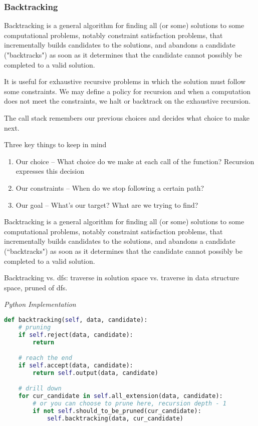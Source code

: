 \documentclass{article}
\begin{document}
    \subsubsection{Backtracking}
    Backtracking is a general algorithm for finding all (or some) solutions to some computational problems, notably constraint satisfaction problems, that incrementally builds candidates to the solutions, and abandons a candidate ("backtracks") as soon as it determines that the candidate cannot possibly be completed to a valid solution. 
    
    It is useful for exhaustive recursive problems in which the solution must follow some constraints. We may define a policy for recursion and when a computation does not meet the constraints, we halt or backtrack on the exhaustive recursion.
    
    The call stack remembers our previous choices and decides what choice to make next.
    
    Three key things to keep in mind
    \begin{enumerate}
        \item Our choice -- What choice do we make at each call of the function? Recursion expresses this decision
        \item Our constraints -- When do we stop following a certain path?
        \item Our goal -- What's our target? What are we trying to find?
    \end{enumerate}
    
    Backtracking is a general algorithm for finding all (or some) solutions to some computational problems, notably constraint satisfaction problems, that incrementally builds candidates to the solutions, and abandons a candidate (``backtracks") as soon as it determines that the candidate cannot possibly be completed to a valid solution.

    Backtracking vs. dfs: traverse in solution space vs. traverse in data structure space, pruned of dfs.
    
\vspace{8pt} \emph{Python Implementation}
\begin{lstlisting}[language=Python]
def backtracking(self, data, candidate):
    # pruning
    if self.reject(data, candidate):
        return

    # reach the end
    if self.accept(data, candidate):
        return self.output(data, candidate)

    # drill down
    for cur_candidate in self.all_extension(data, candidate):
        # or you can choose to prune here, recursion depth - 1
        if not self.should_to_be_pruned(cur_candidate):
            self.backtracking(data, cur_candidate)
\end{lstlisting}
    
\end{document}
